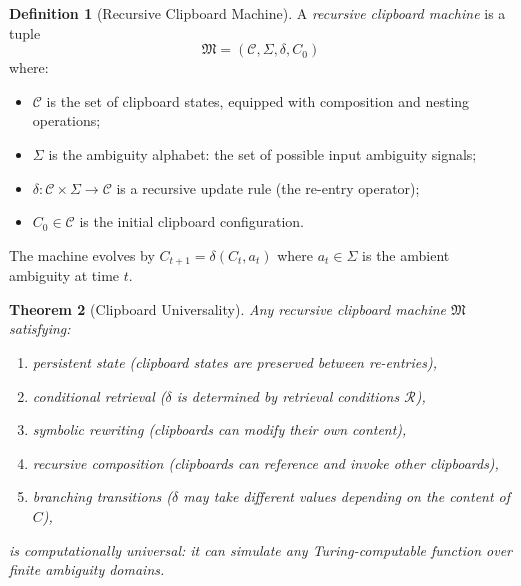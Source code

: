 \documentclass[12pt,oneside]{book}
\theoremstyle{plain}
\newtheorem{theorem}{Theorem}[chapter]
\theoremstyle{definition}
\newtheorem{definition}[theorem]{Definition}
\theoremstyle{plain}
\newcommand{\cC}{\mathcal{C}}
\newcommand{\cR}{\mathcal{R}}
\newcommand{\fM}{\mathfrak{M}}
\begin{document}
\begin{definition}[Recursive Clipboard Machine]
A \emph{recursive clipboard machine} is a tuple
\[
\fM = (\cC, \Sigma, \delta, C_0)
\]
where:
\begin{itemize}[noitemsep]
\item $\cC$ is the set of clipboard states, equipped with composition and nesting operations;
\item $\Sigma$ is the ambiguity alphabet: the set of possible input ambiguity signals;
\item $\delta : \cC \times \Sigma \to \cC$ is a recursive update rule (the re-entry operator);
\item $C_0 \in \cC$ is the initial clipboard configuration.
\end{itemize}
The machine evolves by $C_{t+1} = \delta(C_t, a_t)$ where $a_t \in \Sigma$ is the ambient ambiguity at time $t$.
\end{definition}

\begin{theorem}[Clipboard Universality]
\label{thm:universality}
Any recursive clipboard machine $\fM$ satisfying:
\begin{enumerate}[noitemsep]
\item persistent state (clipboard states are preserved between re-entries),
\item conditional retrieval ($\delta$ is determined by retrieval conditions $\cR$),
\item symbolic rewriting (clipboards can modify their own content),
\item recursive composition (clipboards can reference and invoke other clipboards),
\item branching transitions ($\delta$ may take different values depending on the content of $C$),
\end{enumerate}
is computationally universal: it can simulate any Turing-computable function over finite ambiguity domains.
\end{theorem}
\end{document}

